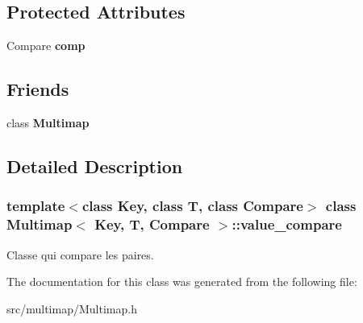 \subsection*{Protected Attributes}
\begin{DoxyCompactItemize}
\item 
\mbox{\label{classMultimap_1_1value__compare_a29c103107b387e1f8620f573f47f9591}} 
Compare {\bfseries comp}
\end{DoxyCompactItemize}
\subsection*{Friends}
\begin{DoxyCompactItemize}
\item 
\mbox{\label{classMultimap_1_1value__compare_a922410cc20fad40c7a00e23639f4e5ac}} 
class {\bfseries Multimap}
\end{DoxyCompactItemize}


\subsection{Detailed Description}
\subsubsection*{template$<$class Key, class T, class Compare$>$\newline
class Multimap$<$ Key, T, Compare $>$\+::value\+\_\+compare}

Classe qui compare les paires. 

The documentation for this class was generated from the following file\+:\begin{DoxyCompactItemize}
\item 
src/multimap/Multimap.\+h\end{DoxyCompactItemize}
